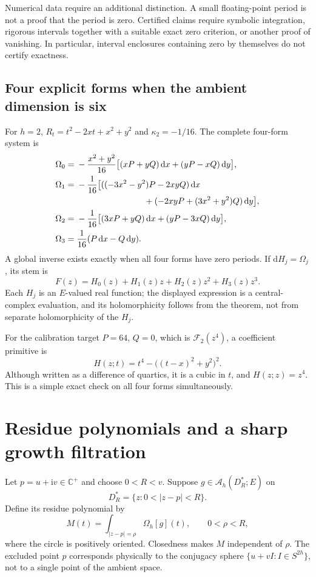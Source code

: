 \documentclass[11pt,a4paper]{article}
\numberwithin{equation}{section}
\theoremstyle{definition}
\theoremstyle{remark}
\newcommand{\C}{\mathbb C}
\newcommand{\ii}{\mathrm i}
\newcommand{\AM}{\mathcal A_h}
\newcommand{\Om}{\Omega_h}
\newcommand{\dd}{\,\mathrm d}
\begin{document}
Numerical data require an additional distinction. A small floating-point period
is not a proof that the period is zero. Certified claims require symbolic
integration, rigorous intervals together with a suitable exact zero criterion,
or another proof of vanishing. In particular, interval enclosures containing
zero by themselves do not certify exactness.

\subsection{Four explicit forms when the ambient dimension is six}

For $h=2$, $R_t=t^2-2xt+x^2+y^2$ and $\kappa_2=-1/16$. The complete four-form
system is
\begin{align}
 \Omega_0={}&-\frac{x^2+y^2}{16}
 \bigl[(xP+yQ)\dd x+(yP-xQ)\dd y\bigr],\label{eq:h2-0}\\
 \Omega_1={}&-\frac1{16}\bigl[
 ((-3x^2-y^2)P-2xyQ)\dd x\nonumber\\
 &\hspace{28mm}+(-2xyP+(3x^2+y^2)Q)\dd y\bigr],\label{eq:h2-1}\\
 \Omega_2={}&-\frac1{16}\bigl[(3xP+yQ)\dd x+(yP-3xQ)\dd y\bigr],
 \label{eq:h2-2}\\
 \Omega_3={}&\frac1{16}(P\dd x-Q\dd y).\label{eq:h2-3}
\end{align}
A global inverse exists exactly when all four forms have zero periods.
If $\mathrm dH_j=\Omega_j$, its stem is
\[
 F(z)=H_0(z)+H_1(z)z+H_2(z)z^2+H_3(z)z^3.
\]
Each $H_j$ is an $E$-valued real function; the displayed expression is a
central-complex evaluation, and its holomorphicity follows from the theorem,
not from separate holomorphicity of the $H_j$.

For the calibration target $P=64$, $Q=0$, which is
$\mathcal F_2(z^4)$, a coefficient primitive is
\[
 H(z;t)=t^4-\bigl((t-x)^2+y^2\bigr)^2.
\]
Although written as a difference of quartics, it is a cubic in $t$, and
$H(z;z)=z^4$. This is a simple exact check on all four forms simultaneously.

\section{Residue polynomials and a sharp growth filtration}
\label{sec:filtration}

Let $p=u+\ii v\in\C^+$ and choose $0<R<v$. Suppose $g\in\AM(D_R^*;E)$ on
\[
 D_R^*=\{z:0<|z-p|<R\}.
\]
Define its residue polynomial by
\begin{equation}\label{eq:residue-definition}
 M(t)=\int_{|z-p|=\rho}\Om[g](t),\qquad 0<\rho<R,
\end{equation}
where the circle is positively oriented. Closedness makes $M$ independent of
$\rho$. The excluded point $p$ corresponds physically to the conjugacy sphere
$\{u+vI:I\in S^{2h}\}$, not to a single point of the ambient space.
\end{document}
